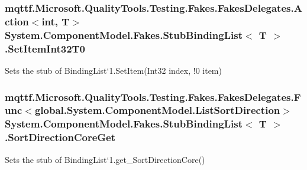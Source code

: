 \hypertarget{class_system_1_1_component_model_1_1_fakes_1_1_stub_binding_list_3_01_t_01_4_a3fd14dc39475da869af97c375bc97af4}{
\subsubsection[{Set\-Item\-Int32\-T0}]{\setlength{\rightskip}{0pt plus 5cm}mqttf.\-Microsoft.\-Quality\-Tools.\-Testing.\-Fakes.\-Fakes\-Delegates.\-Action$<$int, T$>$ System.\-Component\-Model.\-Fakes.\-Stub\-Binding\-List$<$ T $>$.Set\-Item\-Int32\-T0}}\label{class_system_1_1_component_model_1_1_fakes_1_1_stub_binding_list_3_01_t_01_4_a3fd14dc39475da869af97c375bc97af4}


Sets the stub of Binding\-List`1.Set\-Item(Int32 index, !0 item)

\hypertarget{class_system_1_1_component_model_1_1_fakes_1_1_stub_binding_list_3_01_t_01_4_a2462e88a3454d837691a3a39c0a2f866}{
\subsubsection[{Sort\-Direction\-Core\-Get}]{\setlength{\rightskip}{0pt plus 5cm}mqttf.\-Microsoft.\-Quality\-Tools.\-Testing.\-Fakes.\-Fakes\-Delegates.\-Func$<$global.\-System.\-Component\-Model.\-List\-Sort\-Direction$>$ System.\-Component\-Model.\-Fakes.\-Stub\-Binding\-List$<$ T $>$.Sort\-Direction\-Core\-Get}}\label{class_system_1_1_component_model_1_1_fakes_1_1_stub_binding_list_3_01_t_01_4_a2462e88a3454d837691a3a39c0a2f866}


Sets the stub of Binding\-List`1.get\-\_\-\-Sort\-Direction\-Core()

